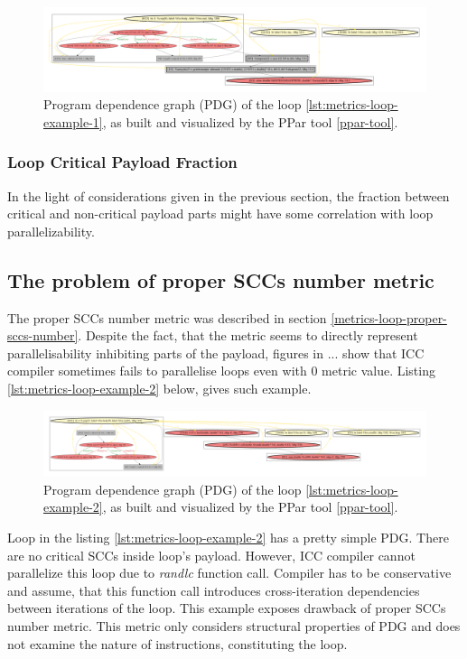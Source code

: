 \begin{figure}[htb]
	\centering
	\includegraphics[width=\linewidth]{figs/metrics-example-loop-1-pdg.pdf}
	\caption{Program dependence graph (PDG) of the loop \ref{lst:metrics-loop-example-1}, as built and visualized by the PPar tool \ref{ppar-tool}.}
	\label{metrics-example-loop-1-pdg}
\end{figure}

\subsubsection{Loop Critical Payload Fraction}
\label{metrics-loop-critical-payload-fraction}
\qquad In the light of considerations given in the previous section, the fraction between critical and non-critical payload parts might have some correlation with loop parallelizability.  

\subsection{The problem of proper SCCs number metric}
\qquad The proper SCCs number metric was described in section \ref{metrics-loop-proper-sccs-number}. Despite the fact, that the metric seems to directly represent parallelisability inhibiting parts of the payload, figures in ... show that ICC compiler sometimes fails to parallelise loops even with 0 metric value. Listing \ref{lst:metrics-loop-example-2} below, gives such example.

\begin{figure}[htb]
	\centering
	\includegraphics[width=\linewidth]{figs/metrics-example-loop-2-pdg.pdf}
	\caption{Program dependence graph (PDG) of the loop \ref{lst:metrics-loop-example-2}, as built and visualized by the PPar tool \ref{ppar-tool}.}
	\label{metrics-example-loop-2-pdg}
\end{figure}

\null\qquad Loop in the listing \ref{lst:metrics-loop-example-2} has a pretty simple PDG. There are no critical SCCs inside loop's payload. However, ICC compiler cannot parallelize this loop due to \textit{randlc} function call. Compiler has to be conservative and assume, that this function call introduces cross-iteration dependencies between iterations of the loop.\newline
\null\qquad This example exposes drawback of proper SCCs number metric. This metric only considers structural properties of PDG and does not examine the nature of instructions, constituting the loop. 



